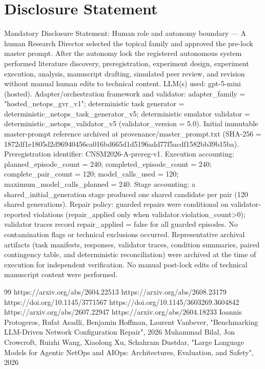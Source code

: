 \documentclass[conference]{IEEEtran}
\begin{document}
\section*{Disclosure Statement}
Mandatory Disclosure Statement: Human role and autonomy boundary --- A human Research Director selected the topical family and approved the pre-lock master prompt. After the autonomy lock the registered autonomous system performed literature discovery, preregistration, experiment design, experiment execution, analysis, manuscript drafting, simulated peer review, and revision without manual human edits to technical content. LLM(s) used: gpt-5-mini (hosted). Adapter/orchestration framework and validator: adapter\_family = "hosted\_netops\_gvr\_v1"; deterministic task generator = deterministic\_netops\_task\_generator\_v5; deterministic emulator validator = deterministic\_netops\_validator\_v5 (validator\_version = 5.0). Initial immutable master-prompt reference archived at provenance/master\_prompt.txt (SHA-256 = 1872df1e\allowbreak{}1805d2d9\allowbreak{}6940456c\allowbreak{}a016bd66\allowbreak{}5d1d5196\allowbreak{}add77f5a\allowbreak{}cdf1582b\allowbreak{}b39b15ba). Preregistration identifier: CNSM2026-A-prereg-v1. Execution accounting: planned\_episode\_count = 240; completed\_episode\_count = 240; complete\_pair\_count = 120; model\_calls\_used = 120; maximum\_model\_calls\_planned = 240. Stage accounting: a shared\_initial\_generation stage produced one shared candidate per pair (120 shared generations). Repair policy: guarded repairs were conditional on validator-reported violations (repair\_applied only when validator.violation\_count>0); validator traces record repair\_applied = false for all guarded episodes. No contamination flags or technical exclusions occurred. Representative archival artifacts (task manifests, responses, validator traces, condition summaries, paired contingency table, and deterministic reconciliation) were archived at the time of execution for independent verification. No manual post-lock edits of technical manuscript content were performed.

\begin{thebibliography}{99}
 https://arxiv.org/abs/2604.22513
 https://arxiv.org/abs/2608.23179
 https://doi.org/10.1145/3771567
 https://doi.org/10.1145/3603269.3604842
 https://arxiv.org/abs/2607.22947
 https://arxiv.org/abs/2604.18233
 Ioannis Protogeros, Rufat Asadli, Benjamin Hoffman, Laurent Vanbever, "Benchmarking LLM-Driven Network Configuration Repair", 2026
 Muhammad Bilal, Jon Crowcroft, Ruizhi Wang, Xiaolong Xu, Schahram Dustdar, "Large Language Models for Agentic NetOps and AIOps: Architectures, Evaluation, and Safety", 2026
\end{thebibliography}
\end{document}
